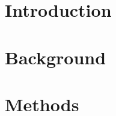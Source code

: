 \fancyhf{}
\fancyfoot[C]{\thepage} %
\pagestyle{fancy}




\chapter{Introduction}



\chapter{Background}






\chapter{Methods}








	
\begin{multicols}{2}
	
\printbibliography
\end{multicols}

%	



